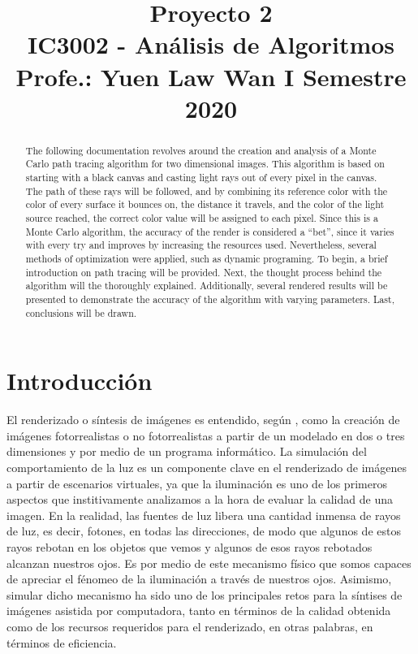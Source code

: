 \documentclass[conference]{IEEEtran}
\begin{document}
\title{Proyecto 2\\
{\footnotesize \textsuperscript{}IC3002 - Análisis de Algoritmos}
{\footnotesize \textsuperscript{}Profe.: Yuen Law Wan}
{\footnotesize \textsuperscript{}I Semestre 2020}
}

\author{
\and
{}
}

\maketitle

\begin{abstract}
The following documentation revolves around the creation and analysis of a Monte Carlo path tracing algorithm for two dimensional images. This algorithm is based on starting with a black canvas and casting light rays out of every pixel in the canvas. The path of these rays will be followed, and by combining its reference color with the color of every surface it bounces on, the distance it travels, and the color of the light source reached, the correct color value will be assigned to each pixel. Since this is a Monte Carlo algorithm, the accuracy of the render is considered a “bet”, since it varies with every try and improves by increasing the resources used. Nevertheless, several methods of optimization were applied, such as dynamic programing. To begin, a brief introduction on path tracing will be provided. Next, the thought process behind the algorithm will the thoroughly explained. Additionally, several rendered results will be presented to demonstrate the accuracy of the algorithm with varying parameters. Last, conclusions will be drawn. 
\end{abstract}

\section{Introducción}

El renderizado o síntesis de imágenes es entendido, según \cite{b1}, como la creación de imágenes fotorrealistas o no fotorrealistas a partir de un modelado en dos o tres dimensiones y por medio de un programa informático. La simulación del comportamiento de la luz es un componente clave en el renderizado de imágenes a partir de escenarios virtuales, ya que la iluminación es uno de los primeros aspectos que institivamente analizamos a la hora de evaluar la calidad de una imagen. En la realidad, las fuentes de luz libera una cantidad inmensa de rayos de luz, es decir, fotones, en todas las direcciones, de modo que algunos de estos rayos rebotan en los objetos que vemos y algunos de esos rayos rebotados alcanzan nuestros ojos. Es por medio de este mecanismo físico que somos capaces de apreciar el fénomeo de la iluminación a través de nuestros ojos. Asimismo, simular dicho mecanismo ha sido uno de los principales retos para la síntises de imágenes asistida por computadora, tanto en términos de la calidad obtenida como de los recursos requeridos para el renderizado, en otras palabras, en términos de eficiencia.
\end{document}
